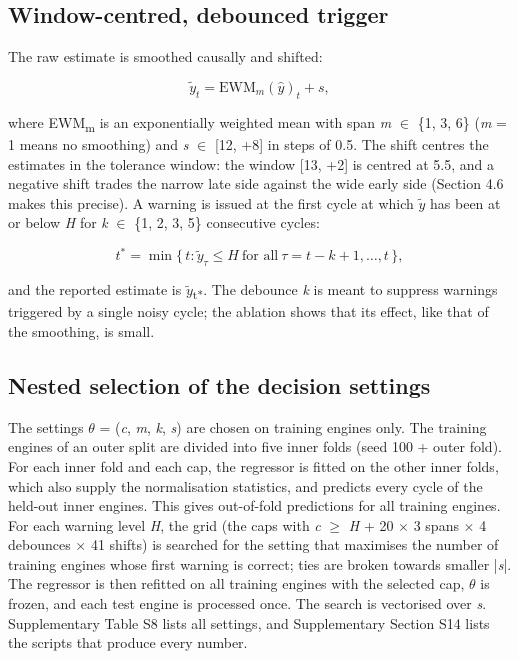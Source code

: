 \documentclass[a4paper,fleqn,doubleblind]{cas-dc}
\begin{document}
\subsection{Window-centred, debounced trigger}

The raw estimate is smoothed causally and shifted:

\begin{equation}
\tilde{y}_t = \mathrm{EWM}_m(\hat{y})_t + s,
\end{equation}

where EWM\textsubscript{m} is an exponentially weighted mean with span \textit{m} $\in$ \{1, 3, 6\} (\textit{m} = 1 means no smoothing) and \textit{s} $\in$ [\textminus{}12, +8] in steps of 0.5. The shift centres the estimates in the tolerance window: the window [\textminus{}13, +2] is centred at \textminus{}5.5, and a negative shift trades the narrow late side against the wide early side (Section 4.6 makes this precise). A warning is issued at the first cycle at which $\tilde{y}$ has been at or below \textit{H} for \textit{k} $\in$ \{1, 2, 3, 5\} consecutive cycles:

\begin{equation}
t^{*} = \min\{\, t : \tilde{y}_{\tau} \le H \ \text{for all}\ \tau = t-k+1, \ldots, t \,\},
\end{equation}

and the reported estimate is $\tilde{y}$\textsubscript{t*}. The debounce \textit{k} is meant to suppress warnings triggered by a single noisy cycle; the ablation shows that its effect, like that of the smoothing, is small.

\subsection{Nested selection of the decision settings}

The settings $\theta$ = (\textit{c}, \textit{m}, \textit{k}, \textit{s}) are chosen on training engines only. The training engines of an outer split are divided into five inner folds (seed 100 + outer fold). For each inner fold and each cap, the regressor is fitted on the other inner folds, which also supply the normalisation statistics, and predicts every cycle of the held-out inner engines. This gives out-of-fold predictions for all training engines. For each warning level \textit{H}, the grid (the caps with \textit{c} $\ge$ \textit{H} + 20 $\times$ 3 spans $\times$ 4 debounces $\times$ 41 shifts) is searched for the setting that maximises the number of training engines whose first warning is correct; ties are broken towards smaller |\textit{s}|. The regressor is then refitted on all training engines with the selected cap, $\theta$ is frozen, and each test engine is processed once. The search is vectorised over \textit{s}. Supplementary Table S8 lists all settings, and Supplementary Section S14 lists the scripts that produce every number.
\end{document}
